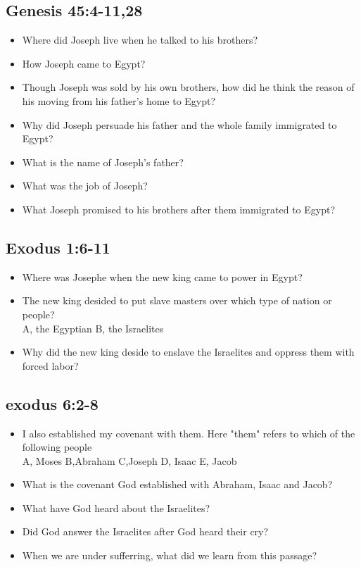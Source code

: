 \subsection{Genesis 45:4-11,28}
\large
\begin{itemize}
\item Where did Joseph live when he talked to his brothers?
\item How Joseph came to Egypt?
\item Though Joseph was sold by his own brothers, how did he think the reason of his moving from his father's home to Egypt?
\item Why did Joseph persuade his father and the whole family immigrated to Egypt?
\item What is the name of Joseph's father?
\item What was the job of Joseph?
\item What Joseph promised to his brothers after them immigrated to Egypt?
\end{itemize}



\subsection{Exodus 1:6-11}
\large
\begin{itemize}
\item Where was Josephe when the new king came to power in Egypt?
\item The new king desided to put slave masters over which type of nation or people?\\
A, the Egyptian \hspace{2cm} B, the Israelites
\item Why did the new king deside to enslave the Israelites and oppress them with forced labor?
\end{itemize}

\subsection{exodus 6:2-8}
\large
\begin{itemize}
\item I also established my covenant with them. Here "them" refers to which of the following people\\
A, Moses \hspace{1cm} B,Abraham \hspace{1cm} C,Joseph \hspace{1cm} D, Isaac  \hspace{1cm} E, Jacob 
\item What is the covenant God established with Abraham, Isaac and Jacob?
\item What have God heard about the Israelites?
\item Did God answer the Israelites after God heard their cry?
\item When we are under sufferring, what did we learn from this passage?
\end{itemize}

